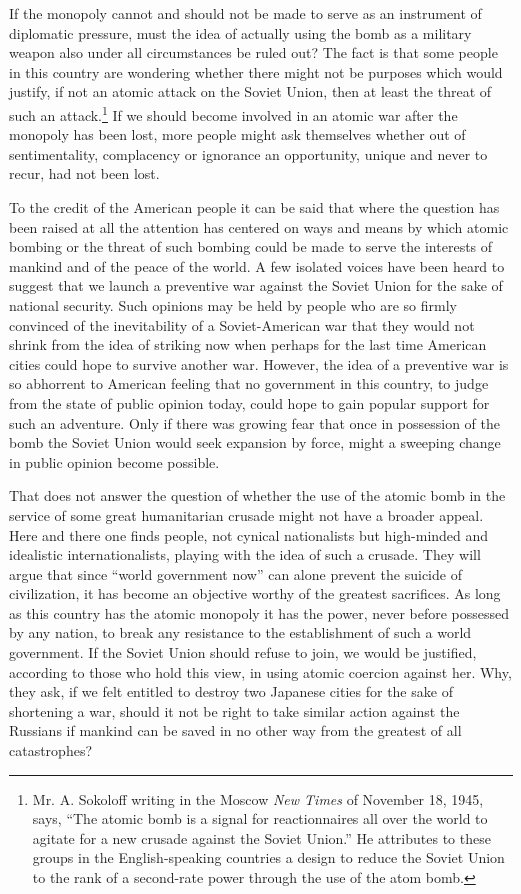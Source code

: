 If the monopoly cannot and should not be made to serve as an instrument of diplomatic pressure, must the idea of actually using the bomb as a military weapon also under all circumstances be ruled out? The fact is that some people in this country are wondering whether there might not be purposes which would justify, if not an atomic attack on the Soviet Union, then at least the threat of such an attack.\footnote{Mr. A. Sokoloff writing in the Moscow \textit{New Times} of November 18, 1945, says, ``The atomic bomb is a signal for reactionnaires all over the world to agitate for a new crusade against the Soviet Union.'' He attributes to these groups in the English-speaking countries a design to reduce the Soviet Union to the rank of a second-rate power through the use of the atom bomb.} If we should become involved in an atomic war after the monopoly has been lost, more people might ask themselves whether out of sentimentality, complacency or ignorance an opportunity, unique and never to recur, had not been lost.

To the credit of the American people it can be said that where the question has been raised at all the attention has centered on ways and means by which atomic bombing or the threat of such bombing could be made to serve the interests of mankind and of the peace of the world. A few isolated voices have been heard to suggest that we launch a preventive war against the Soviet Union for the sake of national security. Such opinions may be held by people who are so firmly convinced of the inevitability of a Soviet-American war that they would not shrink from the idea of striking now when perhaps for the last time American cities could hope to survive another war. However, the idea of a preventive war is so abhorrent to American feeling that no government in this country, to judge from the state of public opinion today, could hope to gain popular support for such an adventure. Only if there was growing fear that once in possession of the bomb the Soviet Union would seek expansion by force, might a sweeping change in public opinion become possible.

That does not answer the question of whether the use of the atomic bomb in the service of some great humanitarian crusade might not have a broader appeal. Here and there one finds people, not cynical nationalists but high-minded and idealistic internationalists, playing with the idea of such a crusade. They will argue that since ``world government now'' can alone prevent the suicide of civilization, it has become an objective worthy of the greatest sacrifices. As long as this country has the atomic monopoly it has the power, never before possessed by any nation, to break any resistance to the establishment of such a world government. If the Soviet Union should refuse to join, we would be justified, according to those who hold this view, in using atomic coercion against her. Why, they ask, if we felt entitled to destroy two Japanese cities for the sake of shortening a war, should it not be right to take similar action against the Russians if mankind can be saved in no other way from the greatest of all catastrophes?

